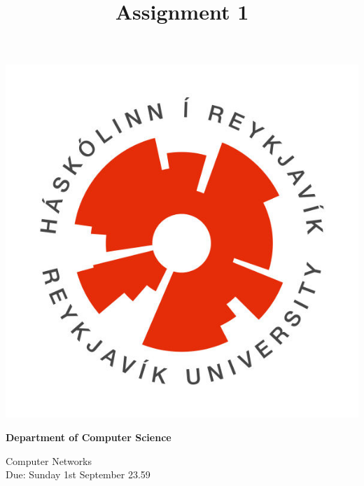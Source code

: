 \documentclass[9pt, addpoints]{exam}
\title{Assignment 1}
\begin{document}
\noindent
\begin{minipage}[l]{.11\textwidth}%
\noindent
    \includegraphics[width=\textwidth]{HR}
\end{minipage}%
\begin{minipage}[r]{.6\textwidth}%
\begin{center}
    {\large\bfseries Department of Computer Science \par
    \large Computer Networks \\[2pt]
    \large Due: Sunday 1st September {23.59}
    }
\end{center}
\end{minipage}%
%
\end{document}
